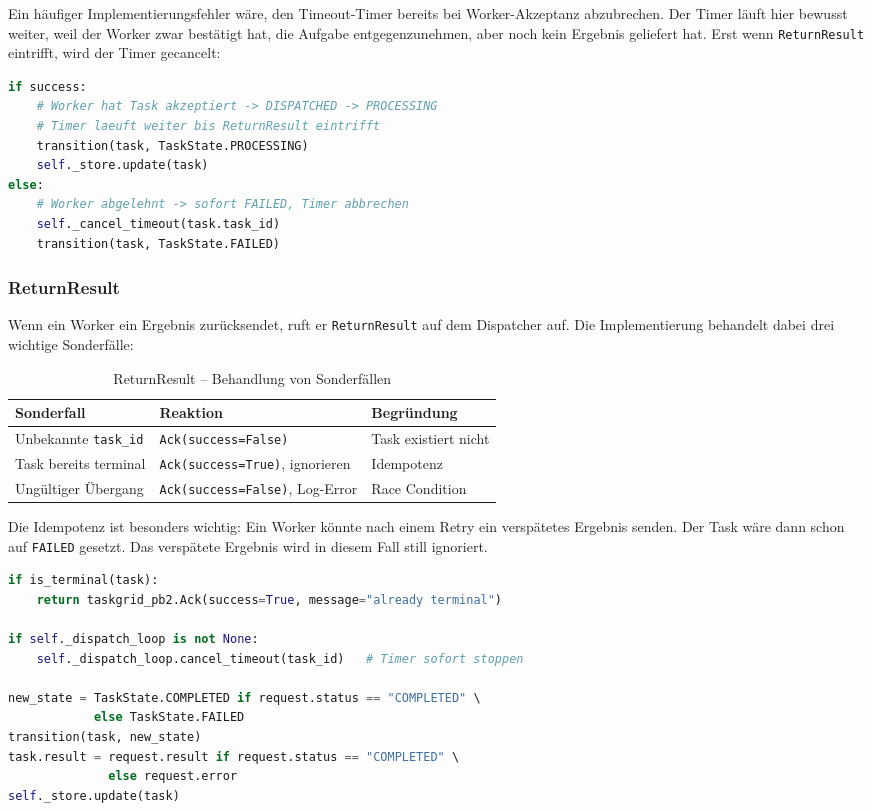 Ein häufiger Implementierungsfehler wäre, den Timeout-Timer bereits bei
Worker-Akzeptanz abzubrechen. Der Timer läuft hier bewusst weiter, weil
der Worker zwar bestätigt hat, die Aufgabe entgegenzunehmen, aber noch kein
Ergebnis geliefert hat. Erst wenn \texttt{ReturnResult} eintrifft, wird der
Timer gecancelt:

\begin{lstlisting}[language=Python,caption={Korrekte Timer-Behandlung in \_dispatch()}]
if success:
    # Worker hat Task akzeptiert -> DISPATCHED -> PROCESSING
    # Timer laeuft weiter bis ReturnResult eintrifft
    transition(task, TaskState.PROCESSING)
    self._store.update(task)
else:
    # Worker abgelehnt -> sofort FAILED, Timer abbrechen
    self._cancel_timeout(task.task_id)
    transition(task, TaskState.FAILED)
\end{lstlisting}

\subsubsection*{ReturnResult}

Wenn ein Worker ein Ergebnis zurücksendet, ruft er \texttt{ReturnResult} auf dem
Dispatcher auf. Die Implementierung behandelt dabei drei wichtige Sonderfälle:

\begin{table}[H]
\centering
\begin{tabular}{lll}
\toprule
\textbf{Sonderfall} & \textbf{Reaktion} & \textbf{Begründung} \\
\midrule
Unbekannte \texttt{task\_id}  & \texttt{Ack(success=False)} & Task existiert nicht \\
Task bereits terminal & \texttt{Ack(success=True)}, ignorieren & Idempotenz \\
Ungültiger Übergang & \texttt{Ack(success=False)}, Log-Error & Race Condition \\
\bottomrule
\end{tabular}
\caption{ReturnResult -- Behandlung von Sonderfällen}
\end{table}
\noindent Die Idempotenz ist besonders wichtig: Ein Worker könnte nach einem Retry
ein verspätetes Ergebnis senden. Der Task wäre dann schon auf \texttt{FAILED}
gesetzt. Das verspätete Ergebnis wird in diesem Fall still ignoriert.

\begin{lstlisting}[language=Python,caption={ReturnResult -- Idempotenz und Timer-Cancel}]
if is_terminal(task):
    return taskgrid_pb2.Ack(success=True, message="already terminal")

if self._dispatch_loop is not None:
    self._dispatch_loop.cancel_timeout(task_id)   # Timer sofort stoppen

new_state = TaskState.COMPLETED if request.status == "COMPLETED" \
            else TaskState.FAILED
transition(task, new_state)
task.result = request.result if request.status == "COMPLETED" \
              else request.error
self._store.update(task)
\end{lstlisting}

